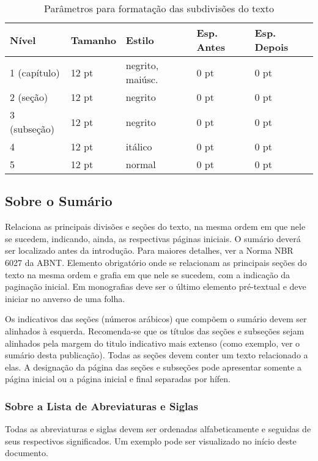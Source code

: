 \documentclass[
	oneside,
	english,brazil,				%
	mestrado,ppgc
	]
	{infufrgs}
\begin{document}
\begin{table}[htbp]
	\centering
	\caption{Parâmetros para formatação das subdivisões do texto}
	\begin{tabular}{lllll} \toprule
		Nível        & Tamanho & Estilo           & Esp. Antes & Esp. Depois \\ \midrule
		1 (capítulo) & 12 pt   & negrito, maiúsc. & 0 pt       & 0 pt \\ 
		2 (seção)    & 12 pt   & negrito          & 0 pt       & 0 pt \\ 
		3 (subseção) & 12 pt   & negrito          & 0 pt       & 0 pt \\ 
		4            & 12 pt   & itálico          & 0 pt       & 0 pt \\ 
		5            & 12 pt   & normal           & 0 pt       & 0 pt \\ \bottomrule
	\end{tabular}
\end{table}

\subsection{Sobre o Sumário}
Relaciona as principais divisões e seções do texto, na mesma ordem em que nele se
sucedem, indicando, ainda, as respectivas páginas iniciais. O sumário deverá ser localizado
antes da introdução. Para maiores detalhes, ver a Norma NBR 6027 da ABNT. Elemento
obrigatório onde se relacionam as principais seções do texto na mesma ordem e grafia em que
nele se sucedem, com a indicação da paginação inicial. Em monografias deve ser o último
elemento pré-textual e deve iniciar no anverso de uma folha.

Os indicativos das seções (números arábicos) que compõem o sumário devem ser
alinhados à esquerda. Recomenda-se que os títulos das seções e subseções sejam alinhados
pela margem do titulo indicativo mais extenso (como exemplo, ver o sumário desta
publicação). Todas as seções devem conter um texto relacionado a elas. A designação da
página das seções e subseções pode apresentar somente a página inicial ou a página inicial e final separadas por hífen.

\subsubsection{Sobre a Lista de Abreviaturas e Siglas}
Todas as abreviaturas e siglas devem ser ordenadas alfabeticamente e seguidas de seus
respectivos significados. Um exemplo pode ser visualizado no início deste documento.
\end{document}
